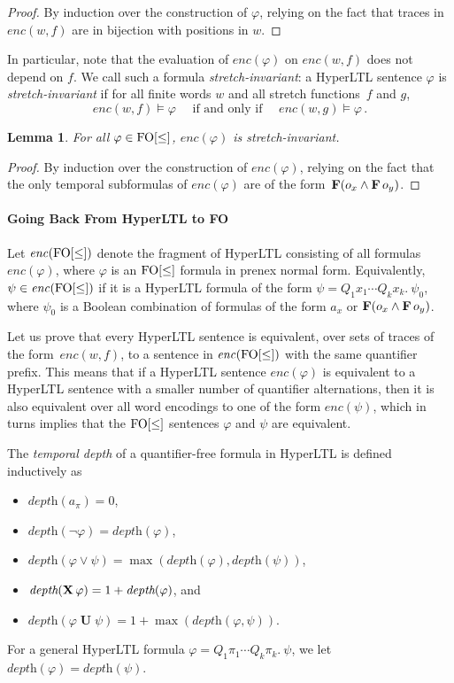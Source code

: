 \documentclass[dvipsnames,10pt,a4paper]{amsart}
\newtheorem{lem}[thm]{Lemma}
\theoremstyle{definition}
\theoremstyle{remark}
\newcommand{\F}{\mathop{\mathbf{F}\vphantom{a}}\nolimits}
\DeclareMathOperator{\U}{\mathbf{U}}
\newcommand{\X}{\mathop{\mathbf{X}\vphantom{a}}\nolimits}
\newcommand{\hyltl}{{HyperLTL}\xspace}
\newcommand\FO{\textup{FO}}
\newcommand\simpleHyperLTL{\encPhi {\FOw}}
\newcommand\depth{\textit{depth}}
\newcommand\FOw{\FO[\le]}
\newcommand\enc[2]{\mathit{enc}(#1,#2)}
\newcommand\encPhi[1]{\mathit{enc}(#1)}
\begin{document}
\begin{proof}
By induction over the construction of $\varphi$, relying on the fact that traces in $\enc w f$ are in bijection with positions in $w$.
\end{proof}

In particular, note that the evaluation of $\encPhi \varphi$ on $\enc w f$ does
not depend on $f$. We call such a formula \emph{stretch-invariant}:
a \hyltl sentence  $\varphi$ is \emph{stretch-invariant} if for all finite words $w$ and all stretch functions~$f$ and $g$,
\[
  \enc w f \models \varphi \quad\text{ if and only if }\quad
  \enc w g \models \varphi \, .
\]


\begin{lem}\label{lem:stretchinv}
  For all $\varphi \in \FOw$, $\encPhi \varphi$ is stretch-invariant.
\end{lem}

\begin{proof}
By induction over the construction of $\encPhi{\varphi}$, relying on the fact that the only temporal subformulas of $\encPhi{\varphi}$ are of the form~$\F(o_x \land \F o_y)$.
\end{proof}


\paragraph{Going Back From \hyltl to FO}
Let $\simpleHyperLTL$ denote the fragment of \hyltl consisting of
all formulas $\encPhi \varphi$, where $\varphi$ is an $\FOw$ formula in
prenex normal form.
Equivalently, $\psi \in \simpleHyperLTL$ if it is a \hyltl formula of the
form $\psi = Q_1x_1 \cdots Q_kx_k.\ \psi_0$, where $\psi_0$ is a Boolean
combination of formulas of the form  $a_x$ or $\F(o_x \land \F o_y)$.

Let us prove that every \hyltl sentence is equivalent, over
sets of traces of the form~$\enc w f$, to a sentence in $\simpleHyperLTL$
with the same quantifier prefix.
This means that if a \hyltl sentence $\encPhi \varphi$ is equivalent to a \hyltl
sentence with a smaller number of quantifier alternations, then it is also
equivalent over all word encodings to one of the form $\encPhi \psi$, which
in turns implies that the $\FOw$ sentences $\varphi$ and $\psi$ are equivalent.

The \emph{temporal depth} of a quantifier-free formula in \hyltl
is defined inductively as
\begin{itemize}\label{defdepth}
\item 	$\depth(a_\pi) = 0$,
\item  $\depth(\lnot \varphi) = \depth(\varphi)$,
\item $\depth(\varphi \lor \psi) = \max(\depth(\varphi),\depth(\psi))$,
\item $\depth(\X \varphi) = 1 + \depth(\varphi)$, and
\item $\depth(\varphi \U \psi) = 1 + \max(\depth(\varphi,\psi))$.
\end{itemize}
For a general \hyltl formula $\varphi = Q_1 \pi_1 \cdots Q_k \pi_k.\ \psi$,
we let $\depth(\varphi) = \depth(\psi)$.
\end{document}
